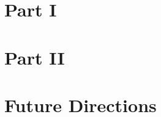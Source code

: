 
\dsp





\graphicspath{{temp_folder/}}

\part{Part I}


\part{Part II}

\part{Future Directions}

{
\ssp %


}

